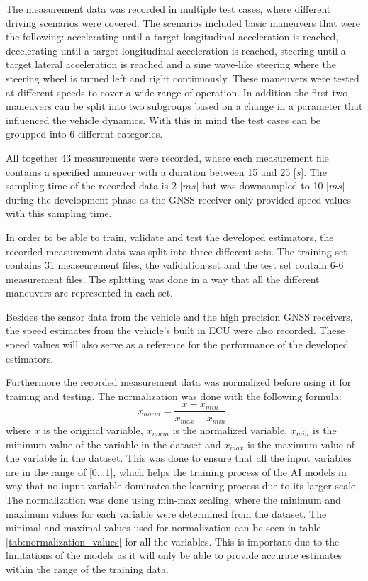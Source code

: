 The measurement data was recorded in multiple test cases, where different driving scenarios were covered. The scenarios included basic maneuvers that were the following: accelerating until a target longitudinal acceleration is reached, decelerating until a target longitudinal acceleration is reached, steering until a target lateral acceleration is reached and a sine wave-like steering where the steering wheel is turned left and right continuously. These maneuvers were tested at different speeds to cover a wide range of operation. In addition the first two maneuvers can be split into two subgroups based on a change in a parameter that influenced the vehicle dynamics. With this in mind the test cases can be groupped into 6 different categories. 

All together 43 measurements were recorded, where each measurement file contains a specified maneuver  with a duration between 15 and 25 [$s$]. The sampling time of the recorded data is 2 [$ms$] but was downsampled to 10 [$ms$] during the development phase as the GNSS receiver only provided speed values with this sampling time. 

In order to be able to train, validate and test the developed estimators, the recorded measurement data was split into three different sets. The training set contains 31 measeurement files, the validation set and the test set contain 6-6 measurement files. The splitting was done in a way that all the different maneuvers are represented in each set.

Besides the sensor data from the vehicle and the high precision GNSS receivers, the speed estimates from the vehicle's built in ECU were also recorded. These speed values will also serve as a reference for the performance of the developed estimators.

Furthermore the recorded measurement data was normalized before using it for training and testing. The normalization was done with the following formula:
\begin{equation}
    x_{norm} = \frac{x - x_{min}}{x_{max} - x_{min}},
\end{equation}
where $x$ is the original variable, $x_{norm}$ is the normalized variable, $x_{min}$ is the minimum value of the variable in the dataset and $x_{max}$ is the maximum value of the variable in the dataset. This was done to ensure that all the input variables are in the range of [0...1], which helps the training process of the AI models in way that no input variable dominates the learning process due to its larger scale. The normalization was done using min-max scaling, where the minimum and maximum values for each variable were determined from the dataset. The minimal and maximal values used for normalization can be seen in table \ref{tab:normalization_values} for all the variables. This is important due to the limitations of the models as it will only be able to provide accurate estimates within the range of the training data. 

